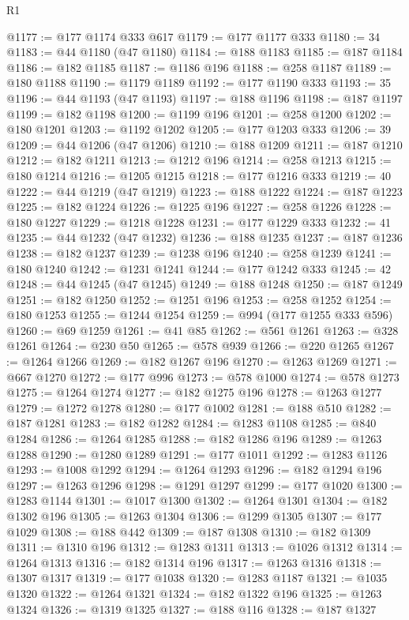 \begin{lexlean}{R1}
\begin{coremodule}
@1177 := @177 @1174 @333 @617
@1179 := @177 @1177 @333
@1180 := 34
@1183 := @44 @1180 (@47 @1180)
@1184 := @188 @1183
@1185 := @187 @1184
@1186 := @182 @1185
@1187 := @1186 @196
@1188 := @258 @1187
@1189 := @180 @1188
@1190 := @1179 @1189
@1192 := @177 @1190 @333
@1193 := 35
@1196 := @44 @1193 (@47 @1193)
@1197 := @188 @1196
@1198 := @187 @1197
@1199 := @182 @1198
@1200 := @1199 @196
@1201 := @258 @1200
@1202 := @180 @1201
@1203 := @1192 @1202
@1205 := @177 @1203 @333
@1206 := 39
@1209 := @44 @1206 (@47 @1206)
@1210 := @188 @1209
@1211 := @187 @1210
@1212 := @182 @1211
@1213 := @1212 @196
@1214 := @258 @1213
@1215 := @180 @1214
@1216 := @1205 @1215
@1218 := @177 @1216 @333
@1219 := 40
@1222 := @44 @1219 (@47 @1219)
@1223 := @188 @1222
@1224 := @187 @1223
@1225 := @182 @1224
@1226 := @1225 @196
@1227 := @258 @1226
@1228 := @180 @1227
@1229 := @1218 @1228
@1231 := @177 @1229 @333
@1232 := 41
@1235 := @44 @1232 (@47 @1232)
@1236 := @188 @1235
@1237 := @187 @1236
@1238 := @182 @1237
@1239 := @1238 @196
@1240 := @258 @1239
@1241 := @180 @1240
@1242 := @1231 @1241
@1244 := @177 @1242 @333
@1245 := 42
@1248 := @44 @1245 (@47 @1245)
@1249 := @188 @1248
@1250 := @187 @1249
@1251 := @182 @1250
@1252 := @1251 @196
@1253 := @258 @1252
@1254 := @180 @1253
@1255 := @1244 @1254
@1259 := @994 (@177 @1255 @333 @596)
@1260 := @69 @1259
@1261 := @41 @85
@1262 := @561 @1261
@1263 := @328 @1261
@1264 := @230 @50
@1265 := @578 @939
@1266 := @220 @1265
@1267 := @1264 @1266
@1269 := @182 @1267 @196
@1270 := @1263 @1269
@1271 := @667 @1270
@1272 := @177 @996
@1273 := @578 @1000
@1274 := @578 @1273
@1275 := @1264 @1274
@1277 := @182 @1275 @196
@1278 := @1263 @1277
@1279 := @1272 @1278
@1280 := @177 @1002
@1281 := @188 @510
@1282 := @187 @1281
@1283 := @182 @1282
@1284 := @1283 @1108
@1285 := @840 @1284
@1286 := @1264 @1285
@1288 := @182 @1286 @196
@1289 := @1263 @1288
@1290 := @1280 @1289
@1291 := @177 @1011
@1292 := @1283 @1126
@1293 := @1008 @1292
@1294 := @1264 @1293
@1296 := @182 @1294 @196
@1297 := @1263 @1296
@1298 := @1291 @1297
@1299 := @177 @1020
@1300 := @1283 @1144
@1301 := @1017 @1300
@1302 := @1264 @1301
@1304 := @182 @1302 @196
@1305 := @1263 @1304
@1306 := @1299 @1305
@1307 := @177 @1029
@1308 := @188 @442
@1309 := @187 @1308
@1310 := @182 @1309
@1311 := @1310 @196
@1312 := @1283 @1311
@1313 := @1026 @1312
@1314 := @1264 @1313
@1316 := @182 @1314 @196
@1317 := @1263 @1316
@1318 := @1307 @1317
@1319 := @177 @1038
@1320 := @1283 @1187
@1321 := @1035 @1320
@1322 := @1264 @1321
@1324 := @182 @1322 @196
@1325 := @1263 @1324
@1326 := @1319 @1325
@1327 := @188 @116
@1328 := @187 @1327

\end{coremodule}
\end{lexlean}
